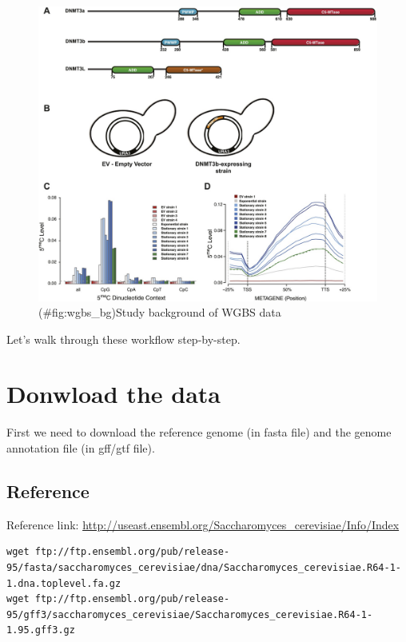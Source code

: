 \documentclass[]{book}
\begin{document}
\begin{figure}
\centering
\includegraphics{figures/elife_yeast_paper.jpg}
\caption{(\#fig:wgbs\_bg)Study background of WGBS data}
\end{figure}

Let's walk through these workflow step-by-step.

\hypertarget{donwload-the-data}{%
\section{Donwload the data}\label{donwload-the-data}}

First we need to download the reference genome (in fasta file) and the genome annotation file (in gff/gtf file).

\hypertarget{reference}{%
\subsection{Reference}\label{reference}}

Reference link: \url{http://useast.ensembl.org/Saccharomyces_cerevisiae/Info/Index}

\begin{verbatim}
wget ftp://ftp.ensembl.org/pub/release-95/fasta/saccharomyces_cerevisiae/dna/Saccharomyces_cerevisiae.R64-1-1.dna.toplevel.fa.gz
wget ftp://ftp.ensembl.org/pub/release-95/gff3/saccharomyces_cerevisiae/Saccharomyces_cerevisiae.R64-1-1.95.gff3.gz
\end{verbatim}
\end{document}
